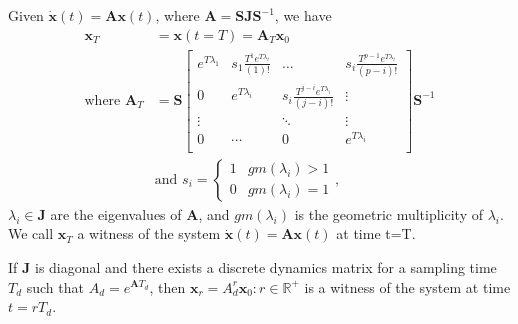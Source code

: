 \documentclass[sigconf]{llncs}
\newcommand{\mat}[1]{\boldsymbol{#1}}
\renewcommand{\vec}[1]{\boldsymbol{#1}}
\begin{document}
 \begin{theorem}
 Given $\dot{\vec{x}}(t)=\mat{A}\vec{x}(t)$, where $\mat{A}=\mat{S}\mat{J}\mat{S}^{-1}$, we have
 \begin{align}
 \vec{x}_T&=\vec{x}(t=T)=\mat{A}_{T}\vec{x}_0\\
 \text{where }\mat{A}_{T}&= \mat{S}
 \left [ \begin{array}{cccc}
 e^{T\lambda_1}  & s_1\frac{T^{1}e^{T\lambda_i}}{(1)!} & \hdots  & s_i\frac{T^{p-1}e^{T\lambda_i}}{(p-i)!} \\
0 & e^{T\lambda_i}  & s_i\frac{T^{j-i}e^{T\lambda_i}}{(j-i)!} & \vdots \\
\vdots & & \ddots & \vdots \\
0 & \cdots & 0  &e^{T\lambda_i} \\
\end{array} \right ]
 \mat{S}^{-1}
 \label{eq:continuous_tube_dyn}\\
 &\text{and } s_i=\left\{\begin{array}{cc}1&gm(\lambda_i)>1\\0&gm(\lambda_i)=1\end{array}\right.,\nonumber
 \end{align}
$\lambda_i \in \mat{J}$ are the eigenvalues of $\mat{A}$, and $gm(\lambda_i)$ is the geometric multiplicity of $\lambda_i$.  We call $\vec{x}_T$ a witness of the system $\dot{\vec{x}}(t)=\mat{A}\vec{x}(t)$ at time t=T.
 \end{theorem}
 \begin{corollary}
 If $\mat{J}$ is diagonal and there exists a discrete dynamics matrix for a sampling time $T_d$ such that $A_d=e^{\mat{A} T_d}$, then $\vec{x}_r=A_d^r\vec{x}_0 : r \in \mathbb{R}^+$ is a witness of the system at time $t=rT_d$.
 \end{corollary}
%
\end{document}
